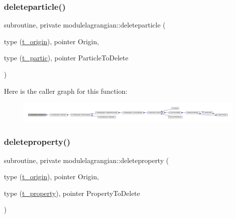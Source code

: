 \subsubsection{\texorpdfstring{deleteparticle()}{deleteparticle()}}
{\footnotesize\ttfamily subroutine, private modulelagrangian\+::deleteparticle (\begin{DoxyParamCaption}\item[{type (\mbox{\hyperlink{structmodulelagrangian_1_1t__origin}{t\+\_\+origin}}), pointer}]{Origin,  }\item[{type (\mbox{\hyperlink{structmodulelagrangian_1_1t__partic}{t\+\_\+partic}}), pointer}]{Particle\+To\+Delete }\end{DoxyParamCaption})\hspace{0.3cm}{\ttfamily [private]}}

Here is the caller graph for this function\+:\nopagebreak
\begin{figure}[H]
\begin{center}
\leavevmode
\includegraphics[width=350pt]{namespacemodulelagrangian_a0acccf68f63b061b6ad6122ccbe76ac1_icgraph}
\end{center}
\end{figure}
\mbox{\label{namespacemodulelagrangian_abff255f913afc4b6a6e6434a97f541f9}} 
\subsubsection{\texorpdfstring{deleteproperty()}{deleteproperty()}}
{\footnotesize\ttfamily subroutine, private modulelagrangian\+::deleteproperty (\begin{DoxyParamCaption}\item[{type (\mbox{\hyperlink{structmodulelagrangian_1_1t__origin}{t\+\_\+origin}}), pointer}]{Origin,  }\item[{type (\mbox{\hyperlink{structmodulelagrangian_1_1t__property}{t\+\_\+property}}), pointer}]{Property\+To\+Delete }\end{DoxyParamCaption})\hspace{0.3cm}{\ttfamily [private]}}

